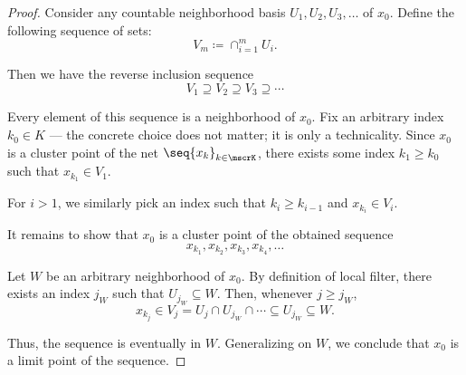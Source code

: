 \begin{proof}
  Consider any countable neighborhood basis \( U_1, U_2, U_3, \ldots \) of \( x_0 \). Define the following sequence of sets:
  \begin{equation*}
    V_m \coloneqq \cap_{i=1}^m U_i.
  \end{equation*}

  Then we have the reverse inclusion sequence
  \begin{equation*}
    V_1 \supseteq V_2 \supseteq V_3 \supseteq \cdots
  \end{equation*}

  Every element of this sequence is a neighborhood of \( x_0 \). Fix an arbitrary index \( k_0 \in K \) --- the concrete choice does not matter; it is only a technicality. Since \( x_0 \) is a cluster point of the net \( \seq{ x_k }_{k \in \mscrK} \), there exists some index \( k_1 \geq k_0 \) such that \( x_{k_1} \in V_1 \).

  For \( i > 1 \), we similarly pick an index such that \( k_i \geq k_{i-1} \) and \( x_{k_i} \in V_i \).

  It remains to show that \( x_0 \) is a cluster point of the obtained sequence
  \begin{equation*}
    x_{k_1}, x_{k_2}, x_{k_3}, x_{k_4}, \ldots
  \end{equation*}

  Let \( W \) be an arbitrary neighborhood of \( x_0 \). By definition of local filter, there exists an index \( j_W \) such that \( U_{j_W} \subseteq W \). Then, whenever \( j \geq j_W \),
  \begin{equation*}
    x_{k_j} \in V_j = U_j \cap U_{j_W} \cap \cdots \subseteq U_{j_W} \subseteq W.
  \end{equation*}

  Thus, the sequence is eventually in \( W \). Generalizing on \( W \), we conclude that \( x_0 \) is a limit point of the sequence.
\end{proof}
